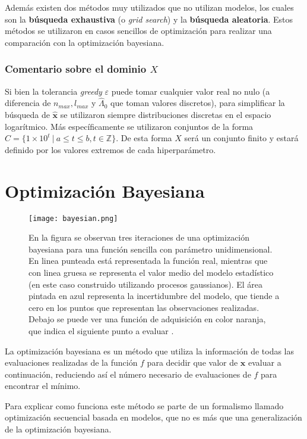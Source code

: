 Además existen dos métodos muy utilizados que no utilizan modelos, los cuales son la \textbf{búsqueda exhaustiva} (o \textit{grid search}) y la \textbf{búsqueda aleatoria}. Estos métodos se utilizaron en casos sencillos de optimización para realizar una comparación con la optimización bayesiana.


\subsubsection*{Comentario sobre el dominio $X$}


Si bien la tolerancia \textit{greedy} $\varepsilon$ puede tomar cualquier valor real no nulo (a diferencia de $n_{max}, l_{max}$ y $\hat{\Lambda}_0$ que toman valores discretos), para simplificar la búsqueda de $\hat{\textbf{x}}$ se utilizaron siempre distribuciones discretas en el espacio logarítmico. Más específicamente se utilizaron conjuntos de la forma $C = \{1\times 10^{t} \  | \ a \leq t \leq b,  t \in {\mathbb{Z}} \}$. De esta forma $X$ será un conjunto finito y estará definido por los valores extremos de cada hiperparámetro. 


\section{Optimización Bayesiana}

\begin{figure}[h!]
\centering
\texttt{[image: bayesian.png]}
\caption{En la figura se observan tres iteraciones de una optimización bayesiana para una función sencilla con parámetro unidimensional. En linea punteada está representada la función real, mientras que con linea gruesa se representa el valor medio del modelo estadístico (en este caso construido utilizando procesos gaussianos). El área pintada en azul representa la incertidumbre del modelo, que tiende a cero en los puntos que representan las observaciones realizadas. Debajo se puede ver una función de adquisición en color naranja, que indica el siguiente punto a evaluar \cite{Feurer2019}.}
\label{fig:bayesian}
\end{figure}

La optimización bayesiana es un método que utiliza la información de todas las evaluaciones realizadas de la función $f$ para decidir que valor de $\textbf{x}$ evaluar a continuación, reduciendo así el número necesario de evaluaciones de $f$ para encontrar el mínimo.

Para explicar como funciona este método se parte de un formalismo llamado optimización secuencial basada en modelos, que no es más que una generalización de la optimización bayesiana.

